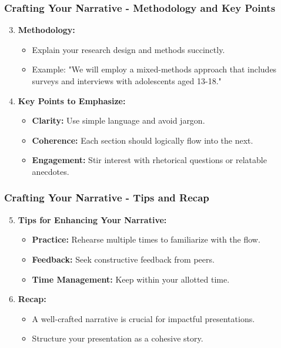 \documentclass[aspectratio=169]{beamer}
\begin{document}
\begin{frame}[fragile]
    \frametitle{Crafting Your Narrative - Methodology and Key Points}
    \begin{enumerate}
        \setcounter{enumi}{2}
        \item \textbf{Methodology:}
        \begin{itemize}
            \item Explain your research design and methods succinctly.
            \item Example: "We will employ a mixed-methods approach that includes surveys and interviews with adolescents aged 13-18."
        \end{itemize}

        \item \textbf{Key Points to Emphasize:}
        \begin{itemize}
            \item \textbf{Clarity:} Use simple language and avoid jargon.
            \item \textbf{Coherence:} Each section should logically flow into the next.
            \item \textbf{Engagement:} Stir interest with rhetorical questions or relatable anecdotes.
        \end{itemize}
    \end{enumerate}
\end{frame}

\begin{frame}[fragile]
    \frametitle{Crafting Your Narrative - Tips and Recap}
    \begin{enumerate}
        \setcounter{enumi}{4}
        \item \textbf{Tips for Enhancing Your Narrative:}
        \begin{itemize}
            \item \textbf{Practice:} Rehearse multiple times to familiarize with the flow.
            \item \textbf{Feedback:} Seek constructive feedback from peers.
            \item \textbf{Time Management:} Keep within your allotted time.
        \end{itemize}

        \item \textbf{Recap:}
        \begin{itemize}
            \item A well-crafted narrative is crucial for impactful presentations.
            \item Structure your presentation as a cohesive story.
        \end{itemize}
    \end{enumerate}
\end{frame}
\end{document}
